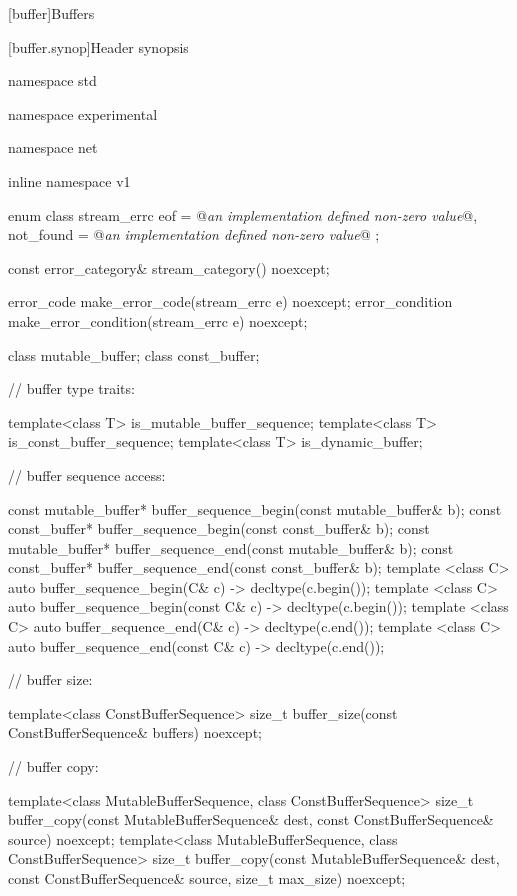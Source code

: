 
[buffer]{Buffers}


[buffer.synop]{Header  synopsis}

\begin{codeblock}
namespace std {
namespace experimental {
namespace net {
inline namespace v1 {

  enum class stream_errc {
    eof = @\textit{an implementation defined non-zero value}@,
    not_found = @\textit{an implementation defined non-zero value}@
  };

  const error_category& stream_category() noexcept;

  error_code make_error_code(stream_errc e) noexcept;
  error_condition make_error_condition(stream_errc e) noexcept;

  class mutable_buffer;
  class const_buffer;

  // buffer type traits:

  template<class T> is_mutable_buffer_sequence;
  template<class T> is_const_buffer_sequence;
  template<class T> is_dynamic_buffer;

  // buffer sequence access:

  const mutable_buffer* buffer_sequence_begin(const mutable_buffer& b);
  const const_buffer* buffer_sequence_begin(const const_buffer& b);
  const mutable_buffer* buffer_sequence_end(const mutable_buffer& b);
  const const_buffer* buffer_sequence_end(const const_buffer& b);
  template <class C> auto buffer_sequence_begin(C& c) -> decltype(c.begin());
  template <class C> auto buffer_sequence_begin(const C& c) -> decltype(c.begin());
  template <class C> auto buffer_sequence_end(C& c) -> decltype(c.end());
  template <class C> auto buffer_sequence_end(const C& c) -> decltype(c.end());

  // buffer size:

  template<class ConstBufferSequence>
    size_t buffer_size(const ConstBufferSequence& buffers) noexcept;

  // buffer copy:

  template<class MutableBufferSequence, class ConstBufferSequence>
    size_t buffer_copy(const MutableBufferSequence& dest,
                       const ConstBufferSequence& source) noexcept;
  template<class MutableBufferSequence, class ConstBufferSequence>
    size_t buffer_copy(const MutableBufferSequence& dest,
                       const ConstBufferSequence& source,
                       size_t max_size) noexcept;

}}}}
\end{codeblock}

